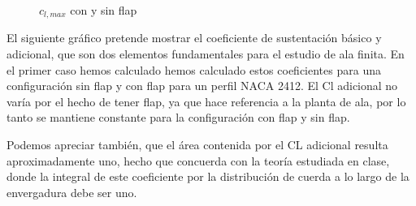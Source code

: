 \documentclass[9pt, a4paper]{article}
\begin{document}
\begin{figure}[H]
  \begin{center}
    \caption{$c_{l,max}$ con y sin flap}
    \label{fig:hw2_5_max}
  \end{center}
\end{figure}

El siguiente gráfico pretende mostrar el coeficiente de sustentación básico y adicional, que son dos elementos fundamentales para el estudio de ala finita. En el primer caso hemos calculado hemos calculado estos coeficientes para una configuración sin flap y con flap para un perfil NACA 2412. El Cl adicional no varía por el hecho de tener flap, ya que hace referencia a la planta de ala, por lo tanto se mantiene constante para la configuración con flap y sin flap.

Podemos apreciar también, que el área contenida por el CL adicional resulta aproximadamente uno, hecho que concuerda con la teoría estudiada en clase, donde la integral de este coeficiente por la distribución de cuerda a lo largo de la envergadura debe ser uno.
\end{document}
